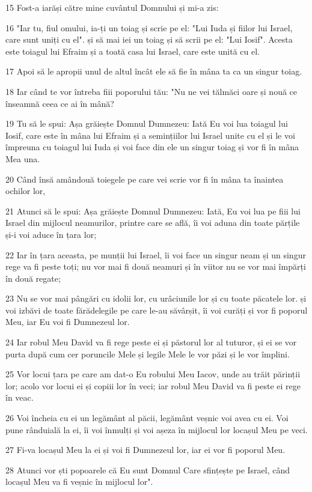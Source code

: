 \par 15 Fost-a iarăși către mine cuvântul Domnului și mi-a zis:
\par 16 "Iar tu, fiul omului, ia-ți un toiag și scrie pe el: "Lui Iuda și fiilor lui Israel, care sunt uniți cu el". și să mai iei un toiag și să scrii pe el: "Lui Iosif". Acesta este toiagul lui Efraim și a toată casa lui Israel, care este unită cu el.
\par 17 Apoi să le apropii unul de altul încât ele să fie în mâna ta ca un singur toiag.
\par 18 Iar când te vor întreba fiii poporului tău: "Nu ne vei tălmăci oare și nouă ce înseamnă ceea ce ai în mână?
\par 19 Tu să le spui: Așa grăiește Domnul Dumnezeu: Iată Eu voi lua toiagul lui Iosif, care este în mâna lui Efraim și a semințiilor lui Israel unite cu el și le voi împreuna cu toiagul lui Iuda și voi face din ele un singur toiag și vor fi în mâna Mea una.
\par 20 Când însă amândouă toiegele pe care vei scrie vor fi în mâna ta înaintea ochilor lor,
\par 21 Atunci să le spui: Așa grăiește Domnul Dumnezeu: Iată, Eu voi lua pe fiii lui Israel din mijlocul neamurilor, printre care se află, îi voi aduna din toate părțile și-i voi aduce în țara lor;
\par 22 Iar în țara aceasta, pe munții lui Israel, îi voi face un singur neam și un singur rege va fi peste toți; nu vor mai fi două neamuri și în viitor nu se vor mai împărți în două regate;
\par 23 Nu se vor mai pângări cu idolii lor, cu urâciunile lor și cu toate păcatele lor. și voi izbăvi de toate fărădelegile pe care le-au săvârșit, îi voi curăți și vor fi poporul Meu, iar Eu voi fi Dumnezeul lor.
\par 24 Iar robul Meu David va fi rege peste ei și păstorul lor al tuturor, și ei se vor purta după cum cer poruncile Mele și legile Mele le vor păzi și le vor împlini.
\par 25 Vor locui țara pe care am dat-o Eu robului Meu Iacov, unde au trăit părinții lor; acolo vor locui ei și copiii lor în veci; iar robul Meu David va fi peste ei rege în veac.
\par 26 Voi încheia cu ei un legământ al păcii, legământ veșnic voi avea cu ei. Voi pune rânduială la ei, îi voi înmulți și voi așeza în mijlocul lor locașul Meu pe veci.
\par 27 Fi-va locașul Meu la ei și voi fi Dumnezeul lor, iar ei vor fi poporul Meu.
\par 28 Atunci vor ști popoarele că Eu sunt Domnul Care sfințește pe Israel, când locașul Meu va fi veșnic în mijlocul lor".

